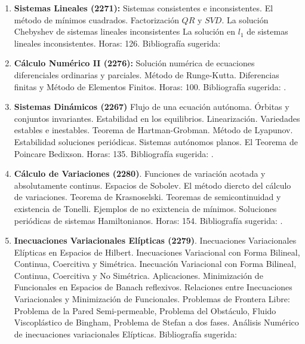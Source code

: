 \documentclass[a4paper, 12pt]{article}
\begin{document}
\begin{description}
\begin{enumerate}
\item\textbf{ Sistemas Lineales (2271):} Sistemas consistentes e inconsistentes. El   método   de   mínimos   cuadrados.   Factorización   $QR$ y $SVD$.
 La solución Chebyshev de sistemas lineales inconsistentes
La solución en $l_1$  de sistemas lineales inconsistentes. Horas: 126. Bibliografía sugerida: \cite{golub,watkins2004fundamentals}




\item\textbf{ Cálculo Numérico II (2276):} Solución numérica de ecuaciones
diferenciales ordinarias y parciales. Método de Runge-Kutta.
Diferencias finitas y Método de Elementos Finitos. Horas: 100. Bibliografía
sugerida: \cite{burden, cheney, kendall, brenner,  thomas}.






\item \textbf{Sistemas Dinámicos (2267)}  Flujo de una ecuación autónoma. Órbitas y conjuntos invariantes. Estabilidad en los equilibrios.   Linearización. Variedades estables e inestables. Teorema de Hartman-Grobman. Método de
Lyapunov. Estabilidad soluciones periódicas. Sistemas autónomos planos. El Teorema de Poincare Bedixson. Horas: 135. Bibliografía  sugerida: \cite{betounes2009differential,teschl2012ordinary}.

\item\textbf{ Cálculo de Variaciones (2280)}. Funciones de variación acotada y absolutamente continus. Espacios de Sobolev. El método diercto del cálculo de variaciones. Teorema de Krasnoselski. Teoremas de semicontinuidad y existencia de Tonelli. Ejemplos de no exixtencia de mínimos. Soluciones periódicas de sistemas Hamiltonianos. Horas: 154. Bibliografía  sugerida: \cite{mawhin2013critical,buttazzo1998one}.

\item\textbf{Inecuaciones Variacionales Elípticas (2279)}. Inecuaciones
Variacionales E\-lípticas en Espacios de Hilbert. Inecuaciones
Variacional con Forma Bilineal, Continua, Coercitiva y Simétrica.
Inecuación Variacional con Forma Bilineal, Continua, Coercitiva y
No Simétrica. Aplicaciones. Minimización de Funcionales en
Espacios de Banach reflexivos. Relaciones entre Inecuaciones
Variacionales y Minimización de Funciona\-les. Problemas de
Frontera Libre: Problema de la Pared Semi-permea\-ble, Problema
del Obstáculo, Fluido Viscoplástico de Bingham, Problema de Stefan
a dos fases. Análisis Numérico de inecuaciones variacionales
Elípticas. Bibliografía sugerida: \cite{ekel, kinder}



\end{enumerate}
\end{description}
\end{document}
